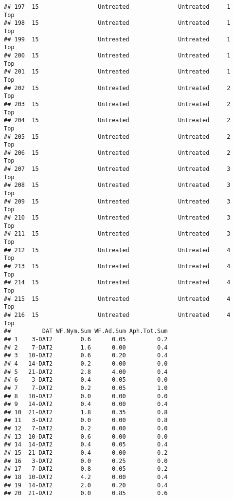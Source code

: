\documentclass[
]{article}
\begin{document}
\begin{verbatim}
## 197  15                 Untreated              Untreated     1           Top
## 198  15                 Untreated              Untreated     1           Top
## 199  15                 Untreated              Untreated     1           Top
## 200  15                 Untreated              Untreated     1           Top
## 201  15                 Untreated              Untreated     1           Top
## 202  15                 Untreated              Untreated     2           Top
## 203  15                 Untreated              Untreated     2           Top
## 204  15                 Untreated              Untreated     2           Top
## 205  15                 Untreated              Untreated     2           Top
## 206  15                 Untreated              Untreated     2           Top
## 207  15                 Untreated              Untreated     3           Top
## 208  15                 Untreated              Untreated     3           Top
## 209  15                 Untreated              Untreated     3           Top
## 210  15                 Untreated              Untreated     3           Top
## 211  15                 Untreated              Untreated     3           Top
## 212  15                 Untreated              Untreated     4           Top
## 213  15                 Untreated              Untreated     4           Top
## 214  15                 Untreated              Untreated     4           Top
## 215  15                 Untreated              Untreated     4           Top
## 216  15                 Untreated              Untreated     4           Top
##         DAT WF.Nym.Sum WF.Ad.Sum Aph.Tot.Sum
## 1    3-DAT2        0.6      0.05         0.2
## 2    7-DAT2        1.6      0.00         0.4
## 3   10-DAT2        0.6      0.20         0.4
## 4   14-DAT2        0.2      0.00         0.0
## 5   21-DAT2        2.8      4.00         0.4
## 6    3-DAT2        0.4      0.05         0.0
## 7    7-DAT2        0.2      0.05         1.0
## 8   10-DAT2        0.0      0.00         0.0
## 9   14-DAT2        0.4      0.00         0.4
## 10  21-DAT2        1.8      0.35         0.8
## 11   3-DAT2        0.0      0.00         0.8
## 12   7-DAT2        0.2      0.00         0.0
## 13  10-DAT2        0.6      0.00         0.0
## 14  14-DAT2        0.4      0.05         0.4
## 15  21-DAT2        0.4      0.00         0.2
## 16   3-DAT2        0.0      0.25         0.0
## 17   7-DAT2        0.8      0.05         0.2
## 18  10-DAT2        4.2      0.00         0.4
## 19  14-DAT2        2.0      0.20         0.4
## 20  21-DAT2        0.0      0.85         0.6

\end{verbatim}
\end{document}
